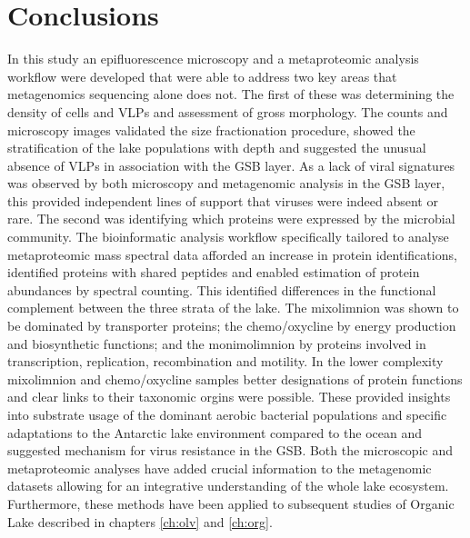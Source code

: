 \section{Conclusions}
In this study an epifluorescence microscopy and a metaproteomic analysis workflow were developed that were able to address two key areas that metagenomics sequencing alone does not.
The first of these was determining the density of cells and \acp{VLP} and assessment of gross morphology.
The counts and microscopy images validated the size fractionation procedure, showed the stratification of the lake populations with depth and suggested the unusual absence of \acp{VLP} in association with the \ac{GSB} layer.
As a lack of viral signatures was observed by both microscopy and metagenomic analysis in the \ac{GSB} layer, this provided independent lines of support that viruses were indeed absent or rare.
The second was identifying which proteins were expressed by the microbial community. 
The bioinformatic analysis workflow specifically tailored to analyse metaproteomic mass spectral data afforded an increase in protein identifications, identified proteins with shared peptides and enabled estimation of protein abundances by spectral counting.
This identified differences in the functional complement between the three strata of the lake.
The mixolimnion was shown to be dominated by transporter proteins; the chemo/oxycline by energy production and biosynthetic functions; and the monimolimnion by proteins involved in transcription, replication, recombination and motility.
In the lower complexity mixolimnion and chemo/oxycline samples better designations of protein functions and clear links to their taxonomic orgins were possible.
These provided insights into substrate usage of the dominant aerobic bacterial populations and specific adaptations to the Antarctic lake environment compared to the ocean and suggested mechanism for virus resistance in the \ac{GSB}.
Both the microscopic and metaproteomic analyses have added crucial information to the metagenomic datasets allowing for an integrative understanding of the whole lake ecosystem.
Furthermore, these methods have been applied to subsequent studies of Organic Lake described in chapters \ref{ch:olv} and \ref{ch:org}. 

